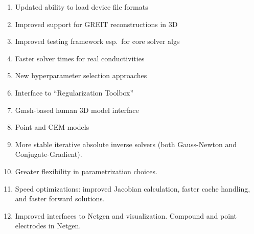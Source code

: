 \documentclass[10pt,letterpaper]{article}
\begin{document}
\begin{multicols}{2}
\begin{enumerate}
\item Updated ability to load device file formats

\item Improved support for GREIT reconstructions in 3D \cite{grychtol2016}

\item Improved testing framework esp.\ for core solver algs

\item Faster solver times for real conductivities

\item New hyperparameter selection approaches \cite{braun2017}

\item Interface to ``Regularization Toolbox'' \cite{hansen2007}

\item Gmsh-based human 3D model interface \cite{grychtol2016}

\item Point and CEM models


\item More stable
  iterative absolute inverse solvers (both Gauss-Newton and
  Conjugate-Gradient).

\item Greater flexibility in parametrization choices.


\item Speed optimizations: improved Jacobian calculation, faster cache handling, and 
  faster forward solutions.


\item Improved interfaces to Netgen and visualization.
      Compound and point electrodes in Netgen.


\end{enumerate}
\end{multicols}
\end{document}
